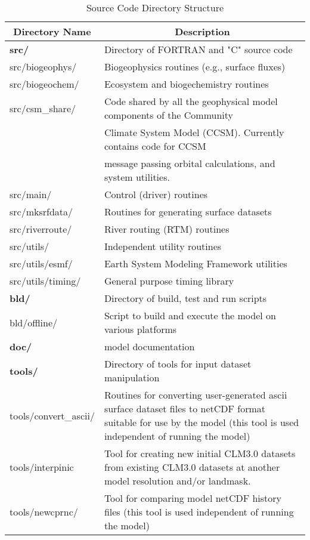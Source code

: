 \begin{longtable}{|p{1.5in}|p{4.5in}|}
\caption{\label{source_directory} Source Code Directory Structure} \\
\hline
\endhead
\hline
\multicolumn{1}{|c|}{\bf Directory Name} & 
\multicolumn{1}{|c|}{\bf Description}  \\ \hline 
{\bf src/}            &   Directory of FORTRAN and "C" source code \\ \hline
src/biogeophys/       &   Biogeophysics routines (e.g., surface fluxes) \\ \hline
src/biogeochem/       &   Ecosystem and biogechemistry routines \\ \hline
src/csm\_share/       &   Code shared by all the geophysical model components of the Community \\
                      &   Climate System Model (CCSM). Currently contains code for CCSM \\
                      &   message passing orbital calculations, and system utilities. \\ \hline
src/main/             &   Control (driver) routines \\ \hline
src/mksrfdata/        &   Routines for generating surface datasets \\ \hline
src/riverroute/       &   River routing (RTM) routines \\ \hline
src/utils/            &   Independent utility routines \\ \hline
src/utils/esmf/       &   Earth System Modeling Framework utilities \\ \hline
src/utils/timing/     &   General purpose timing library \\ \hline
{\bf bld/}            &   Directory of build, test and run scripts \\ \hline        
bld/offline/          &   Script to build and execute the model on various platforms\\ \hline
{\bf doc/}            &   model documentation \\ \hline
{\bf tools/}          &   Directory of tools for input dataset manipulation \\ \hline
tools/convert\_ascii/ &   Routines for converting user-generated ascii surface dataset files to netCDF format suitable for use by the model 
                          (this tool is used independent of running the model) \\ \hline
tools/interpinic      &   Tool for creating new initial CLM3.0 datasets from existing CLM3.0 datasets at
                          another model resolution and/or landmask. \\ \hline
tools/newcprnc/       &   Tool for comparing model netCDF history files (this tool is used independent of running the model) \\ \hline
\end{longtable}

